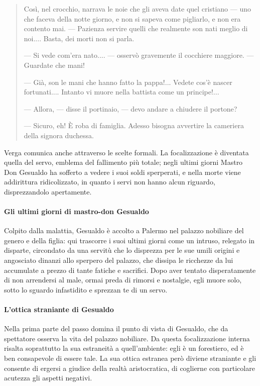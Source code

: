 \documentclass{book}
\begin{document}
\begin{quote}
Così, nel crocchio, narrava le noie che gli aveva date quel cristiano — uno che faceva della notte giorno, e non si sapeva come pigliarlo, e non era contento mai. — Pazienza servire quelli che realmente son nati meglio di noi.... Basta, dei morti non si parla.

— Si vede com’era nato.... — osservò gravemente il cocchiere maggiore. — Guardate che mani!

— Già, son le mani che hanno fatto la pappa!... Vedete cos’è nascer fortunati.... Intanto vi muore nella battista come un principe!...

— Allora, — disse il portinaio, — devo andare a chiudere il portone?

— Sicuro, eh! È roba di famiglia. Adesso bisogna avvertire la cameriera della signora duchessa.
\end{quote}

Verga comunica anche attraverso le scelte formali. La focalizzazione è
diventata quella del servo, emblema del fallimento più totale; negli
ultimi giorni Mastro Don Gesualdo ha sofferto a vedere i suoi soldi
sperperati, e nella morte viene addirittura ridicolizzato, in quanto i
servi non hanno alcun riguardo, disprezzandolo apertamente.

\paragraph{Gli ultimi giorni di mastro-don Gesualdo}

Colpito dalla malattia, Gesualdo è accolto a Palermo nel palazzo nobiliare del genero e della figlia: qui trascorre i suoi ultimi giorni come un intruso, relegato in disparte, circondato da una servitù che lo disprezza per le sue umili origini e angosciato dinanzi allo sperpero del palazzo, che dissipa le ricchezze da lui accumulate a prezzo di tante fatiche e sacrifici. Dopo aver tentato disperatamente di non arrendersi al male, ormai preda di rimorsi e nostalgie, egli muore solo, sotto lo sguardo infastidito e sprezzan te di un servo.

\paragraph{L'ottica straniante di Gesualdo}

Nella prima parte del passo domina il punto di vista di Gesualdo, che da spettatore osserva la vita del palazzo nobiliare. Da questa focalizzazione interna risalta soprattutto la sua estraneità a quell'ambiente: egli è un forestiero, ed è ben consapevole di essere tale. La sua ottica estranea però diviene straniante e gli consente di ergersi a giudice della realtà aristocratica, di coglierne con particolare acutezza gli aspetti negativi.
\end{document}

